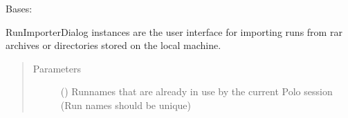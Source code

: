 \documentclass[letterpaper,10pt,english]{sphinxmanual}
\begin{document}
\begin{fulllineitems}
\label{\detokenize{polo.windows:polo.windows.run_importer.RunImporterDialog}}
Bases: 

RunImporterDialog instances are the user interface for importing
runs from rar archives or directories stored on the local machine.
\begin{quote}\begin{description}
\item[{Parameters}] \leavevmode
{} () \textendash{} Runnames that are already in use by the
current Polo session (Run names should be unique)

\end{description}\end{quote}

\begin{fulllineitems}
\label{\detokenize{polo.windows:polo.windows.run_importer.RunImporterDialog.HWI_INDEX}}
\end{fulllineitems}


\begin{fulllineitems}
\label{\detokenize{polo.windows:polo.windows.run_importer.RunImporterDialog.NON_HWI_INDEX}}
\end{fulllineitems}



\end{fulllineitems}
\end{document}
